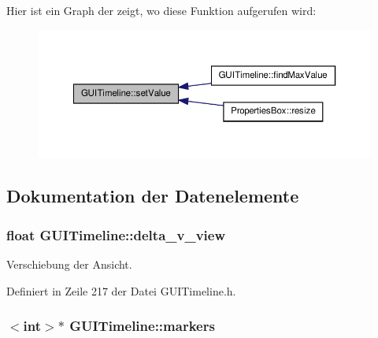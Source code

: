 Hier ist ein Graph der zeigt, wo diese Funktion aufgerufen wird\-:\nopagebreak
\begin{figure}[H]
\begin{center}
\leavevmode
\includegraphics[width=350pt]{classGUITimeline_a0fa4ef5ed2e0fe5f416d9d4c75b86ebc_icgraph}
\end{center}
\end{figure}




\subsection{Dokumentation der Datenelemente}
\hypertarget{classGUITimeline_aba3c330e3e9e5f2f5edb069ecbb9c488}{
\subsubsection[{delta\-\_\-v\-\_\-view}]{\setlength{\rightskip}{0pt plus 5cm}float G\-U\-I\-Timeline\-::delta\-\_\-v\-\_\-view\hspace{0.3cm}{\ttfamily [private]}}}\label{classGUITimeline_aba3c330e3e9e5f2f5edb069ecbb9c488}


Verschiebung der Ansicht. 



Definiert in Zeile 217 der Datei G\-U\-I\-Timeline.\-h.

\hypertarget{classGUITimeline_a8e20b6ed00d7c48716256fffdcfa608a}{
\subsubsection[{markers}]{$<$int$>$$\ast$ G\-U\-I\-Timeline\-::markers\hspace{0.3cm}{\ttfamily [private]}}}\label{classGUITimeline_a8e20b6ed00d7c48716256fffdcfa608a}


